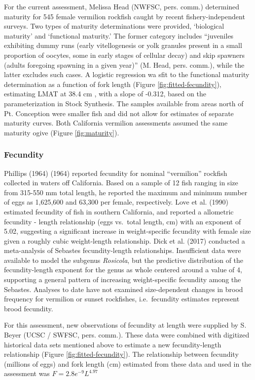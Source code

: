 \documentclass[
  english,
  a4paper,
]{article}
\begin{document}
For the current assessment, Melissa Head (NWFSC, pers. comm.) determined maturity
for 545 female vermilion rockfish caught by recent fishery-independent surveys. Two types
of maturity determinations were provided, `biological maturity' and `functional
maturity.' The former category includes ``juveniles exhibiting dummy runs (early
vitellogenesis or yolk granules present in a small proportion of oocytes, some
in early stages of cellular decay) and skip spawners (adults foregoing spawning
in a given year)'' (M. Head, pers. comm.), while the latter excludes such cases.
A logistic regression wa sfit to the functional maturity determination as a function of fork length (Figure \ref{fig:fitted-fecundity}), estimating LMAT at 38.4 cm , with a slope of -0.312,
based on the parameterization in Stock Synthesis. The samples available from areas north of Pt. Conception were smaller fish and did not allow for estimates of separate
maturity curves. Both California vermilion assessments assumed the same maturity
ogive (Figure \ref{fig:maturity}).

\hypertarget{fecundity}{%
\subsubsection{Fecundity}\label{fecundity}}

Phillips (1964) (1964) reported fecundity for nominal ``vermilion'' rockfish collected in waters off California. Based on a sample of 12 fish ranging in size from 315-550 mm total length, he reported the maximum and minimum number of eggs as 1,625,600 and 63,300 per female, respectively. Love et al. (1990) estimated fecundity of fish in southern California, and reported a allometric fecundity - length relationship (eggs vs.~total length, cm) with an exponent of 5.02, suggesting a significant increase in weight-specific fecundity with female size given a roughly cubic weight-length relationship. Dick et al. (2017) conducted a meta-analysis of Sebastes fecundity-length relationships. Insufficient data were available to model the subgenus \emph{Rosicola}, but the predictive distribution of the fecundity-length exponent for the genus as whole centered around a value of 4, supporting a general pattern of increasing weight-specific fecundity among the Sebastes. Analyses to date have not examined size-dependent changes in brood frequency for vermilion or sunset rockfishes, i.e.~fecundity estimates represent brood fecundity.

For this assessment, new observations of fecundity at length were supplied by S. Beyer (UCSC / SWFSC, pers. comm.). These data were combined with digitized historical data sets mentioned above to estimate a new fecundity-length relationship (Figure \ref{fig:fitted-fecundity}). The relationship between fecundity (millions of eggs) and fork length (cm) estimated from these data and used in the assessment was
\(F = 2.8e^{-9}L^{4.97}\)
\end{document}
